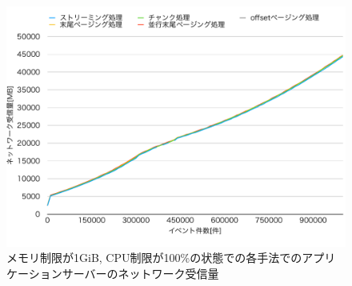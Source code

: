 \documentclass[../../../main]{subfiles}
\begin{document}
    \begin{figure}[H]
        \centering
        \includegraphics[width=12cm]{graph}
        \caption{メモリ制限が1GiB, CPU制限が100\%の状態での各手法でのアプリケーションサーバーのネットワーク受信量}
        \label{fig:app-net-in}
    \end{figure}
\end{document}
